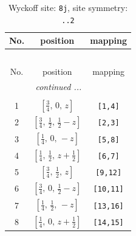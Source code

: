 \documentclass[fleqn,8pt]{jsarticle}
\begin{document}
\begin{longtable}{ccc}
\caption{Wyckoff site: {\tt 8j}, site symmetry: {\tt ..2}}
 \\
 \hline \hline
No. & position & mapping \\ \hline \endfirsthead

\multicolumn{2}{l}{\tablename\ \thetable{}} \\
 \hline \hline
No. & position & mapping \\ \hline \endhead

 \hline \hline
\multicolumn{2}{r}{\footnotesize\it continued ...} \\ \endfoot

 \hline \hline
\multicolumn{2}{r}{} \\ \endlastfoot

1 & $\left[ \frac{3}{4},\, 0,\, z \right]$ & {\tt [1,4]} \\ \hline
2 & $\left[ \frac{3}{4},\, \frac{1}{2},\, \frac{1}{2} - z \right]$ & {\tt [2,3]} \\ \hline
3 & $\left[ \frac{1}{4},\, 0,\, - z \right]$ & {\tt [5,8]} \\ \hline
4 & $\left[ \frac{1}{4},\, \frac{1}{2},\, z + \frac{1}{2} \right]$ & {\tt [6,7]} \\ \hline
5 & $\left[ \frac{3}{4},\, \frac{1}{2},\, z \right]$ & {\tt [9,12]} \\ \hline
6 & $\left[ \frac{3}{4},\, 0,\, \frac{1}{2} - z \right]$ & {\tt [10,11]} \\ \hline
7 & $\left[ \frac{1}{4},\, \frac{1}{2},\, - z \right]$ & {\tt [13,16]} \\ \hline
8 & $\left[ \frac{1}{4},\, 0,\, z + \frac{1}{2} \right]$ & {\tt [14,15]} \\
\end{longtable}
\renewcommand{\arraystretch}{1.2}
\end{document}
